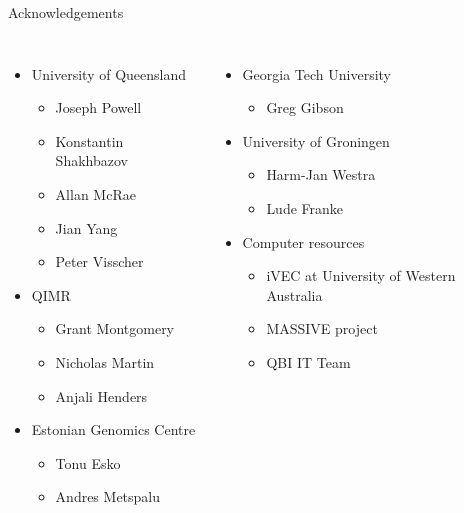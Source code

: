 \documentclass{beamer}
\begin{document}
\begin{frame}{Acknowledgements}
	\begin{columns}[c]
			\begin{itemize}
				\item University of Queensland
				\begin{itemize}
					\item Joseph Powell
					\item Konstantin Shakhbazov
					\item Allan McRae
					\item Jian Yang
					\item Peter Visscher
				\end{itemize}
				\item QIMR
				\begin{itemize}
					\item Grant Montgomery
					\item Nicholas Martin
					\item Anjali Henders
				\end{itemize}
				\item Estonian Genomics Centre
				\begin{itemize}
					\item Tonu Esko
					\item Andres Metspalu
				\end{itemize}
			\end{itemize}
			\begin{itemize}
				\item Georgia Tech University
				\begin{itemize}
					\item Greg Gibson
				\end{itemize}
				\item University of Groningen
				\begin{itemize}
					\item Harm-Jan Westra
					\item Lude Franke
				\end{itemize}
				\item Computer resources
				\begin{itemize}
					\item iVEC at University of Western Australia
					\item MASSIVE project
					\item QBI IT Team
				\end{itemize}
			\end{itemize}
	\end{columns}
\end{frame}
\end{document}
